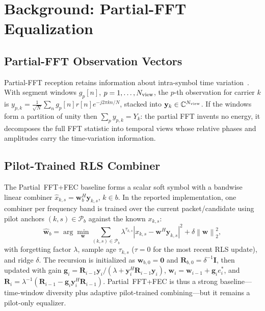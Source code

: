 \documentclass[journal]{IEEEtran}
\newcommand{\C}{\mathbb{C}}
\newcommand{\Ht}{^{H}}
\newcommand{\norm}[1]{\left\lVert #1 \right\rVert}
\newcommand{\abs}[1]{\left\lvert #1 \right\rvert}
\begin{document}
\section{Background: Partial-FFT Equalization}\label{sec:background}
\subsection{Partial-FFT Observation Vectors}
Partial-FFT reception retains information about intra-symbol time
variation~\cite{yerramalli2012partialfft}. With segment windows $g_p[n]$,
$p=1,\dots,N_{\rm view}$, the $p$-th observation for carrier $k$ is
$y_{p,k}=\tfrac{1}{\sqrt N}\sum_{n}g_p[n]r[n]e^{-j2\pi kn/N}$, stacked into
$\mathbf y_k\in\C^{N_{\rm view}}$. If the windows form a partition of unity then
$\sum_p y_{p,k}=Y_k$: the partial FFT invents no energy, it decomposes the full
FFT statistic into temporal views whose relative phases and amplitudes carry the
time-variation information.

\subsection{Pilot-Trained RLS Combiner}
The Partial~FFT+FEC baseline forms a scalar soft symbol with a bandwise linear
combiner $\widehat x_{k,s}=\mathbf w_{b}\Ht\mathbf y_{k,s}$, $k\in b$. In the
reported implementation, one combiner per frequency band is trained over the
current packet/candidate using pilot anchors $(k,s)\in\mathcal P_b$ against the
known $x_{k,s}$:
\begin{equation}
  \widehat{\mathbf w}_b=\arg\min_{\mathbf w}\!\!\sum_{(k,s)\in\mathcal P_b}\!\!
  \lambda^{\tau_{k,s}}\abs{x_{k,s}-\mathbf w\Ht\mathbf y_{k,s}}^2+\delta\norm{\mathbf w}_2^2,
  \label{eq:pfft-ls}
\end{equation}
with forgetting factor $\lambda$, sample age $\tau_{k,s}$ ($\tau=0$ for the most
recent RLS update), and ridge $\delta$. The recursion is initialized as
$\mathbf w_{b,0}=\mathbf 0$ and $\mathbf R_{b,0}=\delta^{-1}\mathbf I$, then
updated with gain $\mathbf g_i=\mathbf R_{i-1}\mathbf y_i/(\lambda+\mathbf
y_i\Ht\mathbf R_{i-1}\mathbf y_i)$, $\mathbf w_i=\mathbf w_{i-1}+\mathbf g_i
e_i^*$, and $\mathbf R_i=\lambda^{-1}(\mathbf R_{i-1}-\mathbf g_i\mathbf y_i\Ht
\mathbf R_{i-1})$. Partial~FFT+FEC is thus a strong baseline---time-window
diversity plus adaptive pilot-trained combining---but it remains a
pilot-only equalizer.
\end{document}
